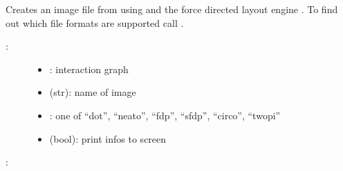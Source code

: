 \documentclass[letterpaper,10pt,english]{sphinxmanual}
\begin{document}
\begin{fulllineitems}
\label{\detokenize{InteractionGraphs:PyBoolNet.InteractionGraphs.igraph2image}}
Creates an image file from  using {\hyperref[\detokenize{Installation:installation-graphviz}]{}} and the force directed layout engine .
To find out which file formats are supported call .
\begin{description}
\item[{:}] \leavevmode\begin{itemize}
\item {} 
: interaction graph

\item {} 
 (str): name of image

\item {} 
: one of “dot”, “neato”, “fdp”, “sfdp”, “circo”, “twopi”

\item {} 
 (bool): print infos to screen

\end{itemize}

\end{description}

:

\begin{sphinxVerbatim}[commandchars=\\\{\}]
 
 
 
\end{sphinxVerbatim}

\end{fulllineitems}
\end{document}
